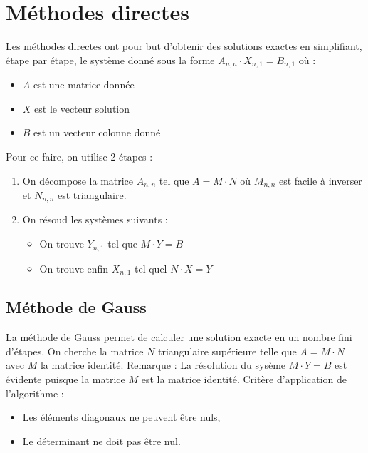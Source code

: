 \documentclass{report}
\begin{document}
  \chapter{Méthodes directes}
    Les méthodes directes ont pour but d'obtenir des solutions exactes en simplifiant, étape par étape, le système donné sous la forme 
    $A_{n,n} \cdot X_{n,1} = B_{n,1}$ où :
    \begin{itemize}
     \item{$A$ est une matrice donnée}
     \item{$X$ est le vecteur solution}
     \item{$B$ est un vecteur colonne donné}
    \end{itemize}
    Pour ce faire, on utilise 2 étapes :
    \begin{enumerate}
     \item{On décompose la matrice $A_{n,n}$ tel que $A = M \cdot N$ où $M_{n,n}$ est facile à inverser et $N_{n,n}$ est triangulaire.}
     \item{On résoud les systèmes suivants : 
           \begin{itemize}
            \item{On trouve $Y_{n,1}$ tel que $M \cdot Y = B$}
            \item{On trouve enfin $X_{n,1} $ tel quel $N \cdot X = Y$}
           \end{itemize}
           }
    \end{enumerate}
    \section{Méthode de Gauss}
      La méthode de Gauss permet de calculer une solution exacte en un nombre fini d'étapes.
      \newline
      On cherche la matrice $N$ triangulaire supérieure telle que $A = M \cdot N$ avec $M$ la matrice identité.
      \newline
      Remarque : La résolution du sysème $M \cdot Y = B$ est évidente puisque la matrice $M$ est la matrice identité.
      \newline
      Critère d'application de l'algorithme :
      \begin{itemize}
        \item{Les éléments diagonaux ne peuvent être nuls,}
        \item{Le déterminant ne doit pas être nul.}
      \end{itemize}
        \lstset{language=C,showstringspaces=false}
\end{document}
